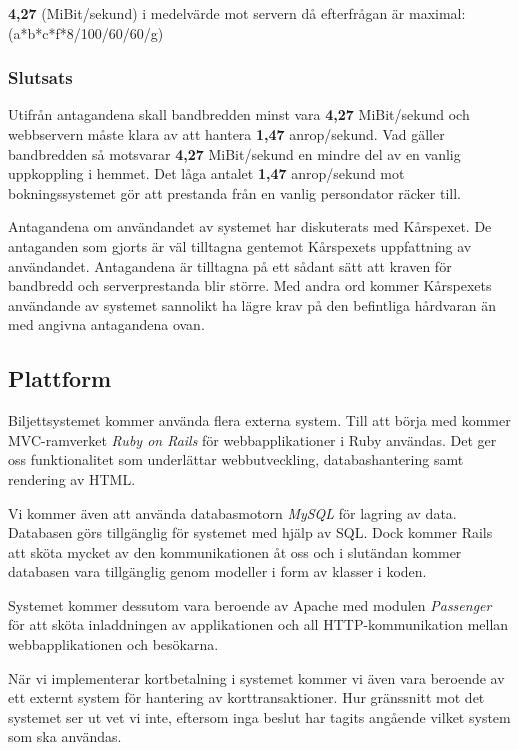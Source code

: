 \documentclass[a4paper, twoside, 11pt, titlepage]{article}
\begin{document}
		\textbf{4,27} (MiBit/sekund) i medelvärde mot servern då efterfrågan är maximal: (a*b*c*f*8/100/60/60/g)

		\subsubsection{Slutsats}


		Utifrån antagandena skall bandbredden minst vara \textbf{4,27} MiBit/sekund och webbservern måste klara av att hantera \textbf{1,47} anrop/sekund. Vad gäller bandbredden så motsvarar \textbf{4,27} MiBit/sekund en mindre del av en vanlig uppkoppling i hemmet. Det låga antalet \textbf{1,47} anrop/sekund mot bokningssystemet gör att prestanda från en vanlig persondator räcker till.

		Antagandena om användandet av systemet har diskuterats med Kårspexet. De antaganden som gjorts är väl tilltagna gentemot Kårspexets uppfattning av användandet. Antagandena är tilltagna på ett sådant sätt att kraven för bandbredd och serverprestanda blir större. Med andra ord kommer Kårspexets användande av systemet sannolikt ha lägre krav på den befintliga hårdvaran än med angivna antagandena ovan.

	\subsection{Plattform}


	Biljettsystemet kommer använda flera externa system. Till att börja med kommer MVC-ramverket \emph{Ruby on Rails} för webbapplikationer i Ruby användas. Det ger oss funktionalitet som underlättar webbutveckling, databashantering samt rendering av HTML.

	Vi kommer även att använda databasmotorn \emph{MySQL} för lagring av data. Databasen görs tillgänglig för systemet med hjälp av SQL. Dock kommer Rails att sköta mycket av den kommunikationen åt oss och i slutändan kommer databasen vara tillgänglig genom modeller i form av klasser i koden. 

	Systemet kommer dessutom vara beroende av Apache med modulen \emph{Passenger} för att sköta inladdningen av applikationen och all HTTP-kommunikation mellan webbapplikationen och besökarna.

	När vi implementerar kortbetalning i systemet kommer vi även vara beroende av ett externt system för hantering av korttransaktioner. Hur gränssnitt mot det systemet ser ut vet vi inte, eftersom inga beslut har tagits angående vilket system som ska användas.
\end{document}
